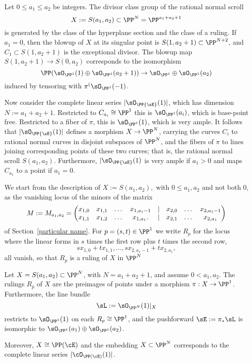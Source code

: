 \begin{corollary}
Let $0\leq a_1\leq a_2$ be integers. The divisor class group of the 
rational normal scroll 
$$
X:=S(a_1,a_2) \subset \PP^N = \PP^{a_1+a_2+1}
$$
is generated by the class of the hyperplane section and the class
of a ruling. If $a_1 = 0$, then the blowup of $X$ at its singular point is $S(1, a_2+1)\subset \PP^{N+2}$,
and $C_1\subset S(1, a_2+1)$ is the exceptional divisor. The blowup map $S(1, a_2+1) \to S(0,a_2)$
corresponds to the isomorphism 
$$
\PP(\sO_{\PP^1}(1) \oplus \sO_{\PP^1}(a_2+1)) \to \sO_{\PP^1} \oplus \sO_{\PP^1}(a_2)
$$
induced by tensoring with $\pi^(\sO_{\PP^1}(-1)$.
\end{corollary}

Now consider the complete linear series $|\sO_\PP{\sE}(1)|$, which has dimension $N := a_1+a_2+1$. Restricted to
$C_{a_i}\cong \PP^1$ this is $\sO_{\PP^1}(a_i)$, which is base-point free. Restricted to a fiber of $\pi$, this is
$\sO_{\PP^1}(1)$, which is very ample. It follows that $|\sO_\PP{\sE}(1)|$ defines a morphism $X\to \PP^{N}$,
carrying the curves $C_i$ to rational normal curves in disjoint subspaces of $\PP^N$, and the fibers of $\pi$ to
lines joining corresponding points of these two curves; that is, the rational normal scroll $S(a_1,a_2)$. Furthermore, 
$|\sO_\PP{\sE}(1)$ is very ample if $a_1>0$ and maps $C_{a_1}$ to a point if $a_1 = 0$.
 

We start from the description of 
$
X:=S(a_{1}, a_{2}),
$
with $0\leq a_{1}, a_{2}$ and not both 0,
as the vanishing locus of the minors of the matrix
$$
\setcounter{MaxMatrixCols}{20}
M:= M_{a_{1}, a_{2}} = 
\begin{pmatrix}
x_{1,0}&x_{1,1}&\dots&x_{1, a_{1}-1}&|&x_{2,0}&\dots&x_{2, a_{1}-1}\\
x_{1,1}&x_{1,2}&\dots&x_{1, a_{1}}.  &|&x_{2,1}&\dots&x_{2, a_{1}}
\end{pmatrix}
$$
of Section~\ref{particular name}. For $p = (s,t) \in \PP^{1}$ we write
$R_{p}$ for the locus where the linear forms in $s$ times the first row plus $t$ times the second row, 
$$
sx_{1,0}+tx_{1,1}, \dots, sx_{2, a_{1}-1}+ tx_{2, a_{1}},
$$
all vanish, so that $R_{p}$ is a ruling of $X$ in $\PP^{N}$


\begin{theorem}\label{scroll as proj}
Let $X = S(a_{1}, a_{2})\subset \PP^{N}$, with $N = a_{1}+a_{2}+1$, and assume $0<a_{1}, a_{2}$. The rulings $R_{p}$ of $X$ are the preimages of points under a morphism $\pi: X\to \PP^{1}$. Furthermore, the line bundle 
$$
\sL := \sO_{\PP^{N}}(1)|_{X}
$$ 
restricts to $\sO_{\PP^{1}}(1)$ on each $R_{p} \cong \PP^{1}$, and the pushforward
$\sE := \pi_{*}\sL$ is isomorphic to 
$\sO_{\PP^{1}}(a_{1})\oplus \sO_{\PP^{1}}(a_{2})$. 

Moreover, $X\cong \PP(\cE)$ and the embedding $X\subset \PP^N$ corresponds to the complete linear series $|\cO_{\PP(\cE)}(1)|$.
\end{theorem} 

